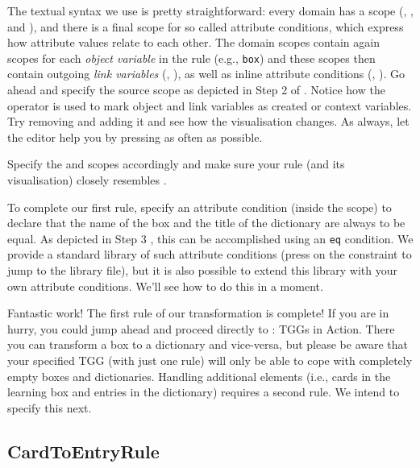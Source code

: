 \begin{stepbystep}
\item The textual syntax we use is pretty straightforward:  every domain has a scope (, , and ), and there is a final scope for so called attribute conditions, which express how attribute values relate to each other.
The domain scopes contain again scopes for each \emph{object variable} in the rule (e.g., \texttt{box}) and these scopes then contain outgoing \emph{link variables} (\eg, ), as well as inline attribute conditions (\eg, ).
Go ahead and specify the source scope as depicted in Step 2 of .
Notice how the \moslTggCode{++} operator is used to mark object and link variables as created or context variables.
Try removing and adding it and see how the visualisation changes.  
As always, let the editor help you by pressing  as often as possible.

\item Specify the  and  scopes accordingly and make sure your rule (and its visualisation) closely resembles .

\item To complete our first rule, specify an attribute condition (inside the  scope) to declare that the name of the box and the title of the dictionary are always to be equal.
As depicted in Step 3 , this can be accomplished using an \texttt{eq} condition.
We provide a standard library of such attribute conditions (press  on the constraint to jump to the library file), but it is also possible to extend this library with your own attribute conditions.
We'll see how to do this in a moment.
\end{stepbystep}

Fantastic work! The first rule of our transformation is complete! 
If you are in hurry, you could jump ahead and proceed directly to : TGGs in Action. 
There you can transform a box to a dictionary and vice-versa, but please be aware that your specified TGG (with just one rule) will only be able to cope with completely empty boxes and dictionaries. 
Handling additional elements (i.e., cards in the learning box and entries in the dictionary) requires a second rule.
We intend to specify this next.

\subsection{CardToEntryRule}

